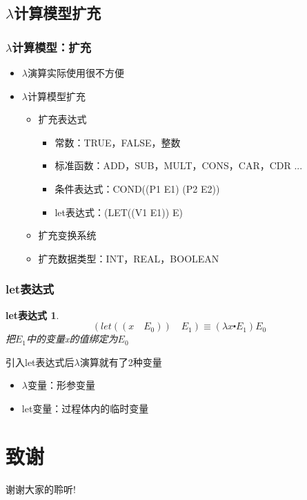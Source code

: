 \documentclass[CJKutf8,compress,hyperref]{beamer}
\begin{document}
\begin{CJK}{UTF8}{song}
\subsection{$\lambda$计算模型扩充}
\begin{frame}
  \frametitle{$\lambda$计算模型：扩充}
  \begin{itemize}
  \item $\lambda$演算实际使用很不方便 
  \item $\lambda$计算模型扩充
    \begin{itemize}
    \item 扩充表达式
      \begin{itemize}
      \item 常数：TRUE，FALSE，整数
      \item 标准函数：ADD，SUB，MULT，CONS，CAR，CDR ...
      \item 条件表达式：COND((P1 E1) (P2 E2)) 
      \item let表达式：(LET((V1 E1)) E) 
      \end{itemize}
    \item 扩充变换系统 
    \item 扩充数据类型：INT，REAL，BOOLEAN
    \end{itemize}
  \end{itemize}
\end{frame}

\begin{frame}
  \frametitle{let表达式} 
  \newtheorem{letE}{let表达式} 
  \begin{letE}
    \begin{displaymath}
      (let ((x \quad E_0)) \quad E_1) \equiv (\lambda x \centerdot E_1) E_0  
    \end{displaymath} 
    把$E_1$中的变量x的值绑定为$E_0$
  \end{letE}
  引入let表达式后$\lambda$演算就有了2种变量 
  \begin{itemize}
  \item $\lambda$变量：形参变量 
  \item let变量：过程体内的临时变量
  \end{itemize}
\end{frame} 

\section{致谢}
\begin{frame}
  \begin{Huge}
    \begin{center}
      谢谢大家的聆听!
    \end{center}
  \end{Huge}
\end{frame}
 
\end{CJK}
\end{document}
